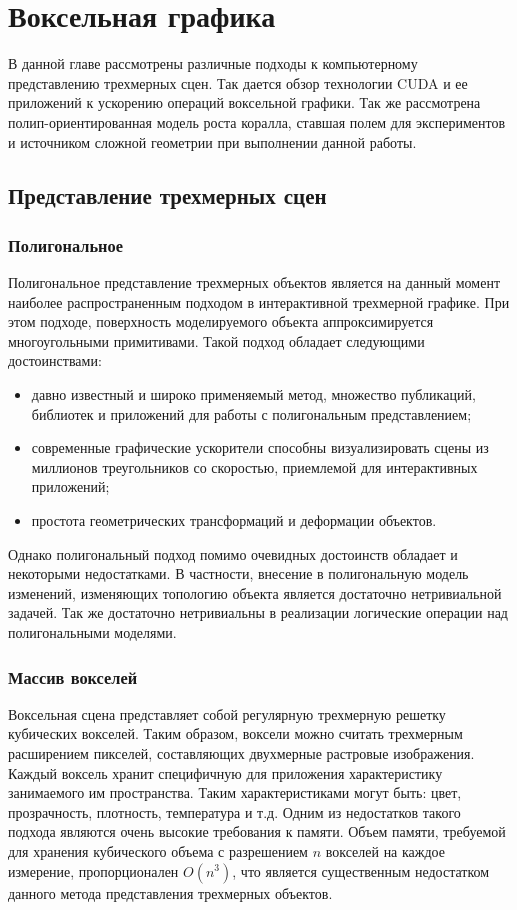 \chapter{Воксельная графика}

В данной главе рассмотрены различные подходы к компьютерному представлению трехмерных сцен. Так дается обзор технологии CUDA и ее приложений к ускорению операций воксельной графики. Так же рассмотрена полип-ориентированная модель роста коралла, ставшая полем для экспериментов и источником сложной геометрии при выполнении данной работы.

\section{Представление трехмерных сцен}
\subsection{Полигональное}

Полигональное представление трехмерных объектов является на данный момент наиболее распространенным подходом в интерактивной трехмерной графике. При этом подходе, поверхность моделируемого объекта аппроксимируется многоугольными примитивами. Такой подход обладает следующими достоинствами:

\begin{itemize}
\item давно известный и широко применяемый метод, множество публикаций, библиотек и приложений для работы с полигональным представлением;
\item современные графические ускорители способны визуализировать сцены из миллионов треугольников со скоростью, приемлемой для интерактивных приложений;
\item простота геометрических трансформаций и деформации объектов.
\end{itemize}

Однако полигональный подход помимо очевидных достоинств обладает и некоторыми недостатками. В частности, внесение в полигональную модель изменений, изменяющих топологию объекта является достаточно нетривиальной задачей. Так же достаточно нетривиальны в реализации логические операции над полигональными моделями. 

\subsection{Массив вокселей}

Воксельная сцена представляет собой регулярную трехмерную решетку кубических вокселей. Таким образом, воксели можно считать трехмерным расширением пикселей, составляющих двухмерные растровые изображения. Каждый воксель хранит специфичную для приложения характеристику занимаемого им пространства. Таким характеристиками могут быть: цвет, прозрачность, плотность, температура и т.д. Одним из недостатков такого подхода являются очень высокие требования к памяти. Объем памяти, требуемой для хранения кубического объема с разрешением $n$ вокселей на каждое измерение, пропорционален $O(n^3)$, что является существенным недостатком данного метода представления трехмерных объектов.

